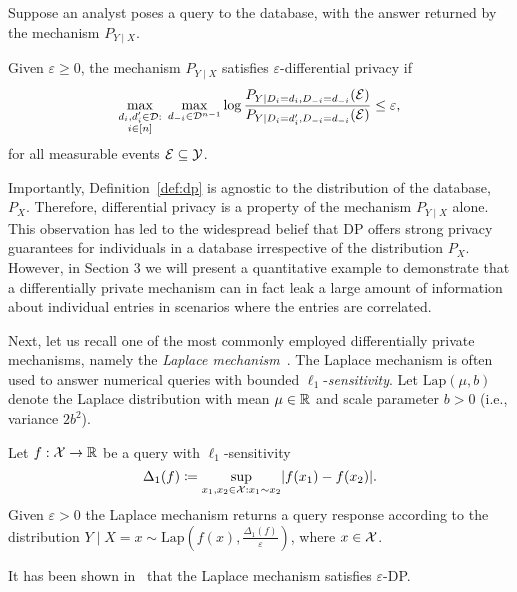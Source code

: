 Suppose an analyst poses a query to the database, with the answer returned by the mechanism $P_{Y \mid X}$.

\begin{definition}
\label{def:dp}
Given $\varepsilon \geq 0$, the mechanism $P_{Y \mid X}$ satisfies $\varepsilon$-differential privacy if 
\begin{equation*}
    \max_{\substack{d_i, d_i' \in \mathcal D: \\ i \in [n]}} \; \max_{d_{-i} \in \mathcal D^{n-1}} \log \frac{P_{Y \mid D_i=d_i, D_{-i} = d_{-i}}(\mathcal{E})}{P_{Y \mid D_i=d_i', D_{-i} = d_{-i}}(\mathcal{E})} \leq \varepsilon,
\end{equation*}
for all measurable events $\mathcal{E} \subseteq \mathcal{Y}$. 
\end{definition}

Importantly, Definition~\ref{def:dp} is agnostic to the distribution of the database, $P_X$. Therefore, differential privacy is a property of the mechanism $P_{Y \mid X}$ alone. This observation has led to the widespread belief that DP offers strong privacy guarantees for individuals in a database irrespective of the distribution $P_X$. However, in Section 3 we will present a quantitative example to demonstrate that a differentially private mechanism can in fact leak a large amount of information about individual entries in scenarios where the entries are correlated. 

Next, let us recall one of the most commonly employed differentially private mechanisms, namely the \emph{Laplace mechanism}~\cite{dworkCalibratingNoiseSensitivity}. The Laplace mechanism is often used to answer numerical queries with bounded $\ell_1$-\emph{sensitivity}. Let $\mathrm{Lap}(\mu, b)$ denote the Laplace distribution with mean $\mu \in \mathbb{R}$ and scale parameter $b>0$ (i.e., variance $2b^2$). 

\begin{definition}
\label{def:laplace_mech}
Let $f : \mathcal{X} \to \mathbb{R}$ be a query with $\ell_1$-sensitivity 
\begin{equation*}
    \Delta_1(f) \coloneqq \sup_{x_1, x_2 \in \mathcal{X} : x_1 \sim x_2} \lvert f(x_1) - f(x_2)\rvert.
\end{equation*}
Given $\varepsilon > 0$ the Laplace mechanism returns a query response according to the distribution $Y \mid X=x \sim \mathrm{Lap}\left(f(x), \frac{\Delta_1(f)}{\varepsilon} \right)$, where $x \in \mathcal{X}$. 
\end{definition}

It has been shown in~\cite{dworkCalibratingNoiseSensitivity} that the Laplace mechanism satisfies $\varepsilon$-DP.

